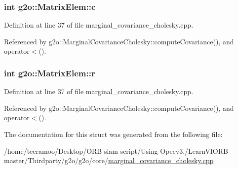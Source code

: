 \subsubsection[{\texorpdfstring{c}{c}}]{\setlength{\rightskip}{0pt plus 5cm}int g2o\+::\+Matrix\+Elem\+::c}\hypertarget{structg2o_1_1MatrixElem_a32574586352669720ba955c1b8cafbc4}{}\label{structg2o_1_1MatrixElem_a32574586352669720ba955c1b8cafbc4}


Definition at line 37 of file marginal\+\_\+covariance\+\_\+cholesky.\+cpp.



Referenced by g2o\+::\+Marginal\+Covariance\+Cholesky\+::compute\+Covariance(), and operator$<$().

\subsubsection[{\texorpdfstring{r}{r}}]{\setlength{\rightskip}{0pt plus 5cm}int g2o\+::\+Matrix\+Elem\+::r}\hypertarget{structg2o_1_1MatrixElem_a5943163fa13505b2d2d9204f3fe61629}{}\label{structg2o_1_1MatrixElem_a5943163fa13505b2d2d9204f3fe61629}


Definition at line 37 of file marginal\+\_\+covariance\+\_\+cholesky.\+cpp.



Referenced by g2o\+::\+Marginal\+Covariance\+Cholesky\+::compute\+Covariance(), and operator$<$().



The documentation for this struct was generated from the following file\+:\begin{DoxyCompactItemize}
\item 
/home/teeramoo/\+Desktop/\+O\+R\+B-\/slam-\/script/\+Using Opecv3./\+Learn\+V\+I\+O\+R\+B-\/master/\+Thirdparty/g2o/g2o/core/\hyperlink{marginal__covariance__cholesky_8cpp}{marginal\+\_\+covariance\+\_\+cholesky.\+cpp}\end{DoxyCompactItemize}
